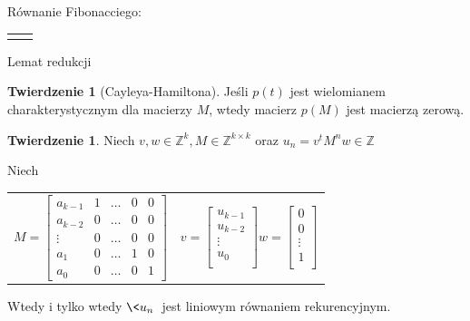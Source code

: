\documentclass[handout]{beamer}
\def\Z{\mathbb Z}
\theoremstyle{definition}
\newtheorem*{twierdzenie}{Twierdzenie}
\theoremstyle{named}
\newtheorem*{namedtheorem}{Twierdzenie}
\begin{document}
\begin{frame}{Równanie Fibonacciego:}
\begin{table}[]
\begin{tabular}{c|c}
\begin{equation*}
    \end{equation*}

    \end{tabular}
\end{table}


\end{frame}

\begin{frame}{Lemat redukcji}

\begin{namedtheorem}[Cayleya-Hamiltona]
    Jeśli $p(t)$ jest wielomianem charakterystycznym dla macierzy $M$, wtedy macierz $p(M)$ jest macierzą zerową. 
\end{namedtheorem}

\begin{twierdzenie}

    Niech $v, w \in \Z^{k}, M \in \Z^{k\times k}$ oraz $u_n = v^{t}M^{n}w \in \Z$
    
    Niech
    \begin{table}[]
        \centering
        \begin{tabular}{c c}
    $
    M = \begin{bmatrix}
    a_{k-1} & 1 & \ldots & 0 & 0 \\
    a_{k-2} & 0 & \ldots & 0 & 0 \\
    \vdots & 0 & \ldots & 0 & 0 \\ 
    a_1 & 0 & \ldots & 1 & 0 \\
    a_0 & 0 & \ldots & 0 & 1
    \end{bmatrix}
    $
             &  
                $v= \begin{bmatrix}
                u_{k-1} \\ u_{k-2} \\ \vdots \\ u_{0} \\
                \end{bmatrix}
                w =  \begin{bmatrix}
                0 \\ 0 \\ \vdots \\ 1 \\
                \end{bmatrix}
                $
             & 
        \end{tabular}

    \end{table}
    
    Wtedy i tylko wtedy $\<u_n\>$ jest liniowym równaniem rekurencyjnym. 

\end{twierdzenie}

\end{frame}
\end{document}
